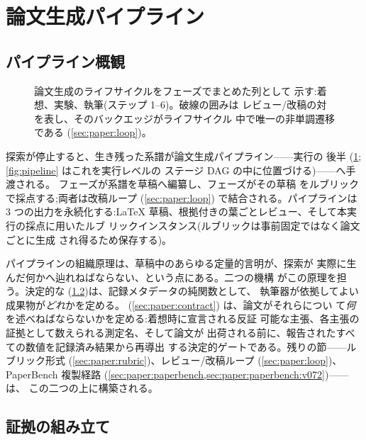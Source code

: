 \section{論文生成パイプライン}\label{sec:paper}

\subsection{パイプライン概観}\label{sec:paper:overview}

\begin{figure}[t]
  \centering
  \resizebox{\columnwidth}{!}{}
  \caption{論文生成のライフサイクルをフェーズでまとめた列として
           示す:着想、実験、執筆(ステップ 1--6)。破線の囲みは
           レビュー/改稿の対を表し、そのバックエッジがライフサイクル
           中で唯一の非単調遷移である
           (\cref{sec:paper:loop})。}
  \label{fig:swim}
\end{figure}

探索が停止すると、生き残った系譜が論文生成パイプライン——実行の
後半 (\cref{fig:swim};\cref{fig:pipeline} はこれを実行レベルの
ステージ DAG の中に位置づける)——へ手渡される。
フェーズが系譜を草稿へ編纂し、フェーズがその草稿
をルブリックで採点する;両者は改稿ループ (\cref{sec:paper:loop})
で結合される。パイプラインは 3 つの出力を永続化する:\LaTeX{}
草稿、根拠付きの葉ごとレビュー、そして本実行の採点に用いたルブ
リックインスタンス(ルブリックは事前固定ではなく論文ごとに生成
され得るため保存する)。

パイプラインの組織原理は、草稿中のあらゆる定量的言明が、探索が
実際に生んだ何かへ辿れねばならない、という点にある。二つの機構
がこの原理を担う。決定的な
(\cref{sec:paper:evidence})は、記録メタデータの純関数として、
執筆器が依拠してよい成果物が\emph{どれ}かを定める。 (\cref{sec:paper:contract}) は、論文がそれらについ
て\emph{何}を述べねばならないかを定める:着想時に宣言される反証
可能な主張、各主張の証拠として数えられる測定名、そして論文が
出荷される前に、報告されたすべての数値を記録済み結果から再導出
する決定的ゲートである。残りの節——ルブリック形式
(\cref{sec:paper:rubric})、レビュー/改稿ループ
(\cref{sec:paper:loop})、PaperBench 複製経路
(\cref{sec:paper:paperbench,sec:paper:paperbench:v072})——は、
この二つの上に構築される。

\subsection{証拠の組み立て}\label{sec:paper:evidence}

